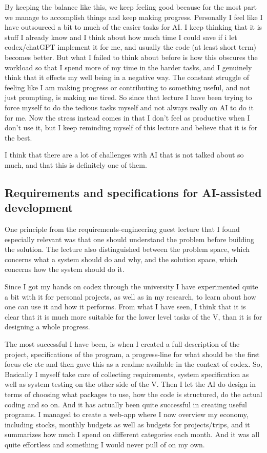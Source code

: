 \documentclass[11pt]{article}
\begin{document}
By keeping the balance like this, we keep feeling good because for the most part we manage to accomplish things and keep making progress. Personally I feel like I have outsourced a bit to much of the easier tasks for AI. I keep thinking that it is stuff I already know and I think about how much time I could save if i let codex/chatGPT implement it for me, and usually the code (at least short term) becomes better. But what I failed to think about before is how this obscures the workload so that I spend more of my time in the harder tasks, and I genuinely think that it effects my well being in a negative way. The constant struggle of feeling like I am making progress or contributing to something useful, and not just prompting, is making me tired. So since that lecture I have been trying to force myself to do the tedious tasks myself and not always really on AI to do it for me. Now the stress instead comes in that I don't feel as productive when I don't use it, but I keep reminding myself of this lecture and believe that it is for the best.

I think that there are a lot of challenges with AI that is not talked about so much, and that this is definitely one of them.

\subsection{Requirements and specifications for AI-assisted development}

One principle from the requirements-engineering guest lecture that I found especially relevant was that one should understand the problem before building the solution. The lecture also distinguished between the problem space, which concerns what a system should do and why, and the solution space, which concerns how the system should do it.

Since I got my hands on codex through the university I have experimented quite a bit with it for personal projects, as well as in my research, to learn about how one can use it and how it performs. From what I have seen, I think that it is clear that it is much more suitable for the lower level tasks of the V, than it is for designing a whole progress.

The most successful I have been, is when I created a full description of the project, specifications of the program, a progress-line for what should be the first focus etc etc and then gave this as a readme available in the context of codex. So, Basically I myself take care of collecting requirements, system specification as well as system testing on the other side of the V. Then I let the AI do design in terms of choosing what packages to use, how the code is structured, do the actual coding and so on. And it has actually been quite successful in creating useful programs. I managed to create a web-app where I now overview my economy, including stocks, monthly budgets as well as budgets for projects/trips, and it summarizes how much I spend on different categories each month. And it was all quite effortless and something I would never pull of on my own.
\end{document}
